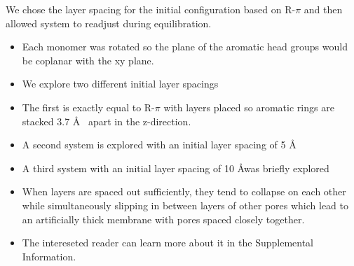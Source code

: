 \documentclass{article}
\newcommand{\angstrom}{\textup{\AA}}
\begin{document}
  We chose the layer spacing for the initial configuration based on R-$\pi$ 
  and then allowed system to readjust during equilibration.
  \begin{itemize}  
    \item Each monomer was rotated so the plane of the aromatic head groups would
    be coplanar with the xy plane.
    \item We explore two different initial layer spacings
    \item The first is exactly equal to R-$\pi$ with layers placed so aromatic
    rings are stacked 3.7 \angstrom~ apart in the z-direction.
    \item A second system is explored with an initial layer spacing of 5 \angstrom
   \item A third system with an initial layer spacing of 10 \angstrom was briefly
    explored
   \item When layers are spaced out sufficiently, they tend to collapse on each other 
   while simultaneously slipping in between layers of other pores which lead to an
   artificially thick membrane with pores spaced closely together.
   \item The intereseted reader can learn more about it in the Supplemental Information.
  \end{itemize}
\end{document}
